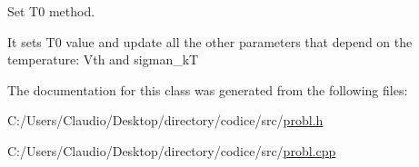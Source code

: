 Set T0 method. 

It sets T0 value and update all the other parameters that depend on the temperature\+: Vth and sigman\+\_\+kT 

The documentation for this class was generated from the following files\+:\begin{DoxyCompactItemize}
\item 
C\+:/\+Users/\+Claudio/\+Desktop/directory/codice/src/\mbox{\hyperlink{probl_8h}{probl.\+h}}\item 
C\+:/\+Users/\+Claudio/\+Desktop/directory/codice/src/\mbox{\hyperlink{probl_8cpp}{probl.\+cpp}}\end{DoxyCompactItemize}
